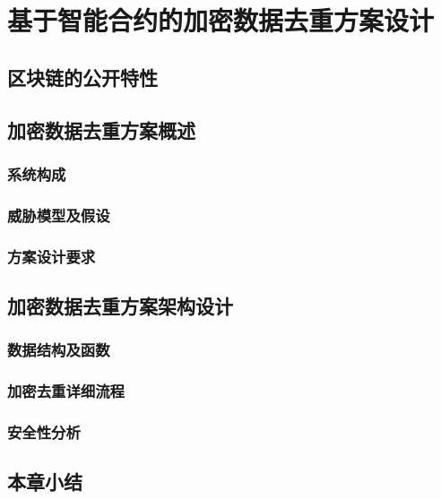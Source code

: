 \chapter{基于智能合约的加密数据去重方案设计}

\section{区块链的公开特性}

\section{加密数据去重方案概述}

\subsection{系统构成}

\subsection{威胁模型及假设}

\subsection{方案设计要求}

\section{加密数据去重方案架构设计}

\subsection{数据结构及函数}

\subsection{加密去重详细流程}

\subsection{安全性分析}

\section{本章小结}

\endinput